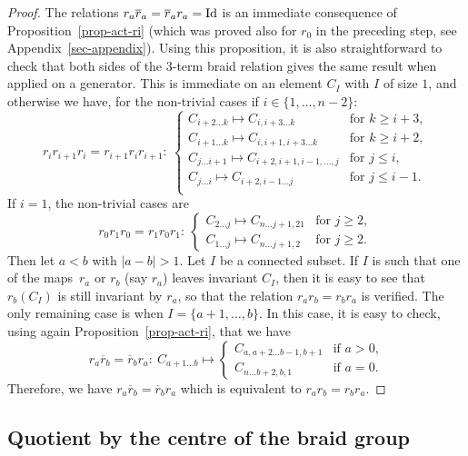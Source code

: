 \documentclass[10pt,a4paper]{amsart}
\numberwithin{equation}{section}
\theoremstyle{definition}
\newcommand{\rb}{\overline{r}}
\begin{document}
\begin{proof}
The relations $r_a\rb_a=\rb_ar_a={\rm Id}$ is an immediate consequence of Proposition~\ref{prop-act-ri} (which was proved also for $r_0$ in the preceding step, see Appendix~\ref{sec-appendix}). Using this proposition, it is also straightforward to check that both sides of the 3-term braid relation gives the same result when applied on a generator. This is immediate on an element $C_I$ with $I$ of size $1$, and otherwise we have, for the non-trivial cases if $i\in\{1,\dots,n-2\}$:
\[r_ir_{i+1}r_i=r_{i+1}r_ir_{i+1}\colon \ \begin{cases}
C_{i+2\dots k} \mapsto C_{i,i+3\dots k} & \text{for }k\geq i+3 , \\
C_{i+1\dots k} \mapsto C_{i,i+1,i+3\dots k} & \text{for }k\geq i+2 , \\
C_{j\dots i+1} \mapsto C_{i+2,i+1,i-1,\dots,j} & \text{for }j\leq i ,\\
C_{j\dots i} \mapsto C_{i+2,i-1\dots j} & \text{for }j\leq i-1 .\\
\end{cases}\]
If $i=1$, the non-trivial cases are
\[r_0r_{1}r_0=r_{1}r_0r_{1}\colon \ \begin{cases}
C_{2\dots j} \mapsto C_{n \dots j+1, 21} & \text{for }j\geq 2 , \\
C_{1\dots j} \mapsto C_{n\dots j+1,2} & \text{for }j\geq 2 .
\end{cases}\]
Then let $a<b$ with $|a-b|>1$. Let $I$ be a connected subset. If $I$ is such that one of the maps~$r_a$ or $r_b$ (say $r_a$) leaves invariant $C_I$, then it is easy to see that $r_b(C_I)$ is still invariant by $r_a$, so that the relation $r_ar_b=r_br_a$ is verified. The only remaining case is when $I=\{a+1,\dots,b\}$. In this case, it is easy to check, using again Proposition~\ref{prop-act-ri}, that we have
\[r_a\rb_b=\rb_br_a\colon \ C_{a+1\dots b}\mapsto \begin{cases} C_{a,a+2\dots b-1,b+1} & \text{if $a>0$,}\\
C_{n\dots b+2, b, 1} & \text{if $a=0$.}
\end{cases}\]
Therefore, we have $r_a\rb_b=\rb_br_a$ which is equivalent to $r_ar_b=r_br_a$.
\end{proof}


\subsection{Quotient by the centre of the braid group}
\end{document}
